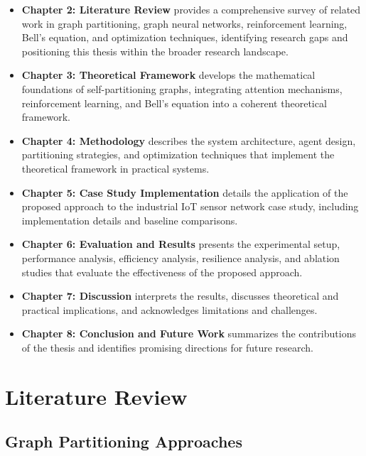 \documentclass{article}
\begin{document}
\begin{itemize}
    \item \textbf{Chapter 2: Literature Review} provides a comprehensive survey of related work in graph partitioning, graph neural networks, reinforcement learning, Bell's equation, and optimization techniques, identifying research gaps and positioning this thesis within the broader research landscape.
    
    \item \textbf{Chapter 3: Theoretical Framework} develops the mathematical foundations of self-partitioning graphs, integrating attention mechanisms, reinforcement learning, and Bell's equation into a coherent theoretical framework.
    
    \item \textbf{Chapter 4: Methodology} describes the system architecture, agent design, partitioning strategies, and optimization techniques that implement the theoretical framework in practical systems.
    
    \item \textbf{Chapter 5: Case Study Implementation} details the application of the proposed approach to the industrial IoT sensor network case study, including implementation details and baseline comparisons.
    
    \item \textbf{Chapter 6: Evaluation and Results} presents the experimental setup, performance analysis, efficiency analysis, resilience analysis, and ablation studies that evaluate the effectiveness of the proposed approach.
    
    \item \textbf{Chapter 7: Discussion} interprets the results, discusses theoretical and practical implications, and acknowledges limitations and challenges.
    
    \item \textbf{Chapter 8: Conclusion and Future Work} summarizes the contributions of the thesis and identifies promising directions for future research.
\end{itemize}

\chapter{Literature Review}

\section{Graph Partitioning Approaches}
\end{document}

